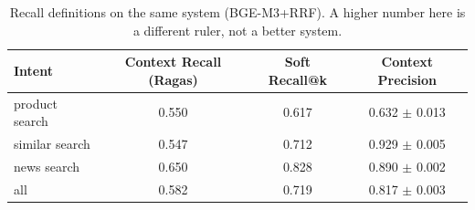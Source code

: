 \begin{table}[t]
\centering
\caption{Recall definitions on the same system (BGE-M3+RRF). A higher number here is a different ruler, not a better system.}
\label{tab:metrics}
\begin{tabular}{lccc}
\toprule
Intent & Context Recall (Ragas) & Soft Recall@k & Context Precision \\
\midrule
product search & 0.550 & 0.617 & 0.632 $\pm$ 0.013 \\
similar search & 0.547 & 0.712 & 0.929 $\pm$ 0.005 \\
news search & 0.650 & 0.828 & 0.890 $\pm$ 0.002 \\
all & 0.582 & 0.719 & 0.817 $\pm$ 0.003 \\
\bottomrule
\end{tabular}
\end{table}